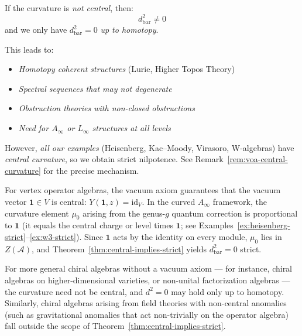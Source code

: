 \begin{remark}\label{rem:non-central-curvature}
If the curvature is \emph{not central}, then:
\begin{equation}
d_{\text{bar}}^2 \neq 0
\end{equation}
and we only have $d_{\text{bar}}^2 = 0$ \emph{up to homotopy}.

This leads to:
\begin{itemize}
\item \emph{Homotopy coherent structures} (Lurie, Higher Topos Theory)
\item \emph{Spectral sequences that may not degenerate}
\item \emph{Obstruction theories with non-closed obstructions}
\item \emph{Need for $A_\infty$ or $L_\infty$ structures at all levels}
\end{itemize}

However, \emph{all our examples} (Heisenberg, Kac--Moody, Virasoro, W-algebras) have
\emph{central curvature}, so we obtain strict nilpotence.  See
Remark~\ref{rem:voa-central-curvature} for the precise mechanism.
\end{remark}

\begin{remark}\label{rem:voa-central-curvature}
For vertex operator algebras, the vacuum axiom guarantees that the vacuum vector
$\mathbf{1}\in V$ is central: $Y(\mathbf{1},z) = \mathrm{id}_V$.  In the curved
$A_\infty$ framework, the curvature element $\mu_0$ arising from the genus-$g$
quantum correction is proportional to $\mathbf{1}$ (it equals the central charge or
level times $\mathbf{1}$; see Examples~\ref{ex:heisenberg-strict}--\ref{ex:w3-strict}).
Since $\mathbf{1}$ acts by the identity on every module, $\mu_0$ lies in $Z(\mathcal{A})$,
and Theorem~\ref{thm:central-implies-strict} yields $d_{\mathrm{bar}}^2=0$ strict.

For more general chiral algebras without a vacuum axiom --- for instance, chiral
algebras on higher-dimensional varieties, or non-unital factorization algebras ---
the curvature need not be central, and $d^2=0$ may hold only up to homotopy.
Similarly, chiral algebras arising from field theories with non-central anomalies
(such as gravitational anomalies that act non-trivially on the operator algebra)
fall outside the scope of Theorem~\ref{thm:central-implies-strict}.
\end{remark}

